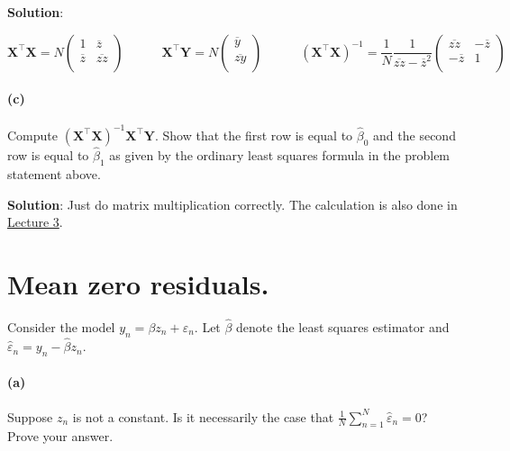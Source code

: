 \documentclass[
  letterpaper,
  DIV=11,
  numbers=noendperiod]{scrartcl}
\let\oldparagraph\paragraph
\renewcommand{\paragraph}[1]{\oldparagraph{#1}\mbox{}}
\begin{document}
\textbf{Solution}:

\[
\boldsymbol{X}^\intercal\boldsymbol{X}= 
N \begin{pmatrix}
1 & \overline{z} \\
\overline{z} & \overline{zz} \\
\end{pmatrix}
\quad\quad\quad
\boldsymbol{X}^\intercal\boldsymbol{Y}= N \begin{pmatrix}
\overline{y} \\
\overline{zy} \\
\end{pmatrix}
\quad\quad\quad
(\boldsymbol{X}^\intercal\boldsymbol{X})^{-1} = 
\frac{1}{N}
\frac{1}{\overline{zz} - \overline{z}^2}
\begin{pmatrix}
\overline{zz} & -\overline{z} \\
-\overline{z} & 1 \\
\end{pmatrix}
\]

\hypertarget{c}{%
\paragraph{(c)}\label{c}}

Compute
\((\boldsymbol{X}^\intercal\boldsymbol{X})^{-1} \boldsymbol{X}^\intercal\boldsymbol{Y}\).
Show that the first row is equal to \(\hat{\beta}_0\) and the second row
is equal to \(\hat{\beta}_1\) as given by the ordinary least squares
formula in the problem statement above.

\textbf{Solution}: Just do matrix multiplication correctly. The
calculation is also done in \href{/lectures/Lecture3.qmd}{Lecture 3}.

\hypertarget{mean-zero-residuals.}{%
\section{Mean zero residuals.}\label{mean-zero-residuals.}}

Consider the model \(y_n = \beta z_n + \varepsilon_n\). Let
\(\hat{\beta}\) denote the least squares estimator and
\(\hat{\varepsilon}_n = y_n - \hat{\beta}z_n\).

\hypertarget{a-1}{%
\paragraph{(a)}\label{a-1}}

Suppose \(z_n\) is not a constant. Is it necessarily the case that
\(\frac{1}{N} \sum_{n=1}^N\hat{\varepsilon}_n = 0\)? Prove your answer.
\end{document}
